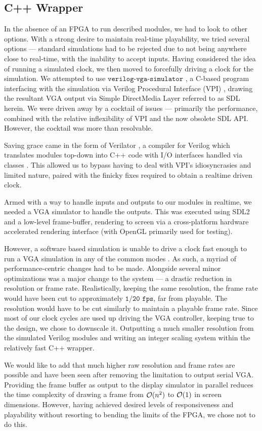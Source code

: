 \subsection{C++ Wrapper}
\label{subsection:cppwrap}

In the absence of an FPGA to run described modules, 
we had to look to other options. With a strong desire to 
maintain real-time playability, we tried several options ---
standard simulations had to be rejected due to not being 
anywhere close to real-time, with the inability to accept inputs.
Having considered the idea of running a simulated clock, we then
moved to forcefully driving a clock for the simulation. We attempted
to use \(\texttt{verilog-vga-simulator}\) \cite{vga-simulator},
a C-based program interfacing with the simulation via 
Verilog Procedural Interface (VPI) \cite{vpi}, drawing the resultant
VGA output via Simple DirectMedia Layer \cite{sdl} referred to as 
SDL herein. We were driven away by a cocktail of issues --- primarily
the performance, combined with the relative inflexibility of VPI 
and the now obsolete \cite{sdl_obsolete} SDL API. However, the cocktail
was more than resolvable.

Saving grace came in the form of Verilator \cite{verilator}, a compiler for
Verilog which translates modules top-down into C++ code with
I/O interfaces handled via classes \cite{verilator-implement}. This allowed
us to bypass having to deal with VPI's idiosyncrasies and limited nature, paired
with the finicky fixes required to obtain a realtime driven clock.

Armed with a way to handle inputs and outputs to our modules in realtime, we 
needed a VGA simulator to handle the outputs. This was executed using
SDL2 \cite{sdl2} and a low-level frame-buffer, rendering to screen via 
a cross-platform hardware accelerated rendering interface (with OpenGL \cite{opengl}
primarily used for testing).

However, a software based simulation is unable to drive a clock fast enough
to run a VGA simulation in any of the common modes \cite{vga_modes}. As such,
a myriad of performance-centric changes had to be made. Alongside several
minor optimizations was a major change to the system --- a drastic reduction in
resolution or frame rate. Realistically, keeping the same resolution, the frame 
rate would have been cut to approximately \(\texttt{1/20 fps}\), far from playable.
The resolution would have to be cut similarly to maintain a playable frame rate.
Since most of our clock cycles are used up driving the VGA controller, keeping true
to the design, we chose to downscale it. Outputting a much smaller resolution from
the simulated Verilog modules and writing an integer scaling \cite{intscale} system
within the relatively fast C++ wrapper. 

We would like to add that much higher raw resolution and frame rates are possible 
and have been seen after removing the limitation to output serial VGA. Providing
the frame buffer as output to the display simulator in parallel reduces the time
complexity of drawing a frame from \(\mathcal{O} (n^2)\) to \(\mathcal{O} (1)\) in screen 
dimensions. However, having achieved desired levels of responsiveness and 
playability without resorting to bending the limits of the FPGA, we chose not 
to do this.